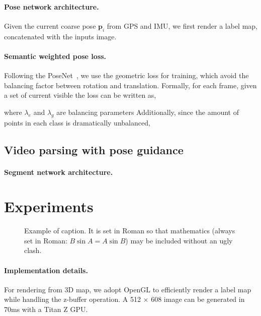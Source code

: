 \documentclass[10pt,twocolumn,letterpaper]{article}
\newcommand{\ve}[1]{{\mathbf #1}} %
\begin{document}
\paragraph{Pose network architecture.} 
Given the current coarse pose $\ve{p}_{i}$ from GPS and IMU, we first render a label map, concatenated with the inputs image. 


\paragraph{Semantic weighted pose loss.} 
Following the PoseNet~\cite{}, we use the geometric loss for training, which avoid the balancing factor between rotation and translation. 
Formally, for each frame, given a set of current visible  the loss can be written as,

where $\lambda_e$ and $\lambda_g$ are balancing parameters
Additionally, since the amount of points in each class is dramatically unbalanced,


\subsection{Video parsing with pose guidance}


\paragraph{Segment network architecture.}


\section{Experiments}
\label{sec:experiments}


\begin{figure}[t]
\begin{center}
\fbox{\rule{0pt}{2in} \rule{0.9\linewidth}{0pt}}
\end{center}
   \caption{Example of caption.  It is set in Roman so that mathematics
   (always set in Roman: $B \sin A = A \sin B$) may be included without an
   ugly clash.}
\label{fig:long}
\label{fig:onecol}
\end{figure}

\paragraph{Implementation details.} For rendering from 3D map, we adopt OpenGL to efficiently render a label map while handling the z-buffer operation. A 512 $\times$ 608 image can be generated in 70ms with a Titan Z GPU. 
\end{document}

